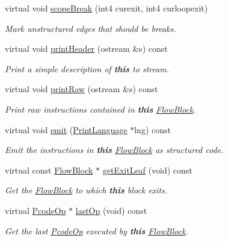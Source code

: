 \begin{DoxyCompactItemize}
virtual void \mbox{\hyperlink{class_block_goto_ad409112a4ad46f076a923bd152428a83}{scope\+Break}} (int4 curexit, int4 curloopexit)
\begin{DoxyCompactList}\small\item\em Mark unstructured edges that should be {\itshape breaks}. \end{DoxyCompactList}\item 
virtual void \mbox{\hyperlink{class_block_goto_a01f0af5a9043ec72c96e3f2591d0c469}{print\+Header}} (ostream \&s) const
\begin{DoxyCompactList}\small\item\em Print a simple description of {\bfseries{this}} to stream. \end{DoxyCompactList}\item 
virtual void \mbox{\hyperlink{class_block_goto_aa665d1bc9ba041f0c90c52322abf5727}{print\+Raw}} (ostream \&s) const
\begin{DoxyCompactList}\small\item\em Print raw instructions contained in {\bfseries{this}} \mbox{\hyperlink{class_flow_block}{Flow\+Block}}. \end{DoxyCompactList}\item 
virtual void \mbox{\hyperlink{class_block_goto_a0efc3af4b5fda8bf5f04b0fbca784935}{emit}} (\mbox{\hyperlink{class_print_language}{Print\+Language}} $\ast$lng) const
\begin{DoxyCompactList}\small\item\em Emit the instructions in {\bfseries{this}} \mbox{\hyperlink{class_flow_block}{Flow\+Block}} as structured code. \end{DoxyCompactList}\item 
virtual const \mbox{\hyperlink{class_flow_block}{Flow\+Block}} $\ast$ \mbox{\hyperlink{class_block_goto_a18080132d5cd3398eb972335368359e2}{get\+Exit\+Leaf}} (void) const
\begin{DoxyCompactList}\small\item\em Get the \mbox{\hyperlink{class_flow_block}{Flow\+Block}} to which {\bfseries{this}} block exits. \end{DoxyCompactList}\item 
virtual \mbox{\hyperlink{class_pcode_op}{Pcode\+Op}} $\ast$ \mbox{\hyperlink{class_block_goto_a1989016995f57acf0da08f1318a75d43}{last\+Op}} (void) const
\begin{DoxyCompactList}\small\item\em Get the last \mbox{\hyperlink{class_pcode_op}{Pcode\+Op}} executed by {\bfseries{this}} \mbox{\hyperlink{class_flow_block}{Flow\+Block}}. \end{DoxyCompactList}\item 

\end{DoxyCompactItemize}

